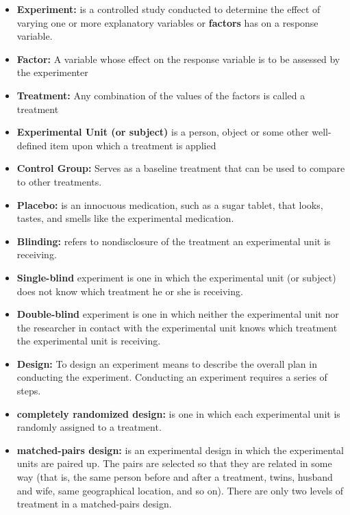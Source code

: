 \documentclass{report}
\begin{document}
        \begin{itemize}
            \item \textbf{Experiment:} is a controlled study conducted to determine the effect of varying one or more explanatory variables or \textbf{factors} has on a response variable. 
            \item \textbf{Factor:} A variable whose effect on the response variable is to be assessed by the experimenter
            \item \textbf{Treatment:} Any combination of the values of the factors is called a treatment
            \item \textbf{Experimental Unit (or subject)} is a person, object or some other well-defined item upon which a treatment is applied
            \item \textbf{Control Group:} Serves as a baseline treatment that can be used to compare to other treatments.
            \item \textbf{Placebo:} is an innocuous medication, such as a sugar tablet, that looks, tastes, and smells like the experimental medication.
            \item \textbf{Blinding:} refers to nondisclosure of the treatment an experimental unit is receiving.
            \item \textbf{Single-blind} experiment is one in which the experimental unit (or subject) does not know which treatment he or she is receiving.
            \item \textbf{Double-blind} experiment is one in which neither the experimental unit nor the researcher in contact with the experimental unit knows which treatment the experimental unit is receiving.
            \item \textbf{Design:} To design an experiment means to describe the overall plan in conducting the experiment. Conducting an experiment requires a series of steps.
            \item \textbf{completely randomized design:} is one in which each experimental unit is randomly assigned to a treatment.
            \item \textbf{matched-pairs design:} is an experimental design in which the experimental units are paired up. The pairs are selected so that they are related in some way (that is, the same person before and after a treatment, twins, husband and wife, same geographical location, and so on). There are only two levels of treatment in a matched-pairs design.
        \end{itemize}
\end{document}
